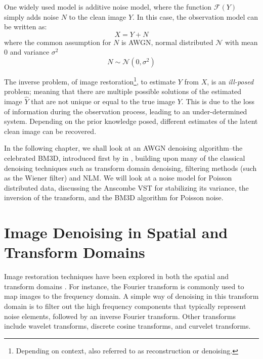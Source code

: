 One widely used model is additive noise model, where the function $\mathcal{F}(Y)$ simply adds noise $N$ to the clean image $Y$. In this case, the observation model can be written as:
\begin{equation}\label{eq:observation-model-additive}
    X = Y + N
\end{equation}
where the common assumption for $N$ is \gls{AWGN}, normal distributed $\mathcal{N}$ with mean \num{0} and variance $\sigma^2$
\begin{equation}\label{eq:awgn}
    N \sim \mathcal{N}(0, \sigma^2)
\end{equation}

The inverse problem, of image restoration\footnote{Depending on context, also referred to as reconstruction or denoising.}, to estimate $Y$ from $X$, is an \textit{ill-posed} problem; meaning that there are multiple possible solutions of the estimated image $\hat{Y}$ that are not unique or equal to the true image $Y$. This is due to the loss of information during the observation process, leading to an under-determined system. Depending on the prior knowledge posed, different estimates of the latent clean image can be recovered.

In the following chapter, we shall look at an \gls{AWGN} denoising algorithm--the celebrated \gls{BM3D}, introduced first by \citeauthor{dabovImageDenoisingSparse2007} in \cite{dabovImageDenoisingSparse2007}, building upon many of the classical denoising techniques such as transform domain denoising, filtering methods (such as the Wiener filter) and \gls{NLM}. We will look at a noise model for Poisson distributed data, discussing the Anscombe \gls{VST} for stabilizing its variance, the inversion of the transform, and the \gls{BM3D} algorithm for Poisson noise.

\section{Image Denoising in Spatial and Transform Domains}
Image restoration techniques have been explored in both the spatial and transform domains \cite{buadesReviewImageDenoising2005,diwakarReviewCTImage2018}. For instance, the Fourier transform is commonly used to map images to the frequency domain. A simple way of denoising in this transform domain is to filter out the high frequency components that typically represent noise elements, followed by an inverse Fourier transform. Other transforms include wavelet transforms, discrete cosine transforms, and curvelet transforms.

